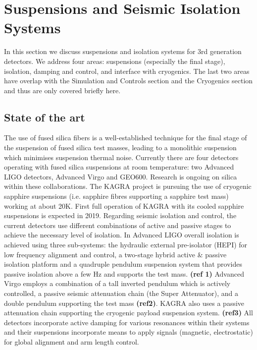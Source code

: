 \chapter{Suspensions and Seismic Isolation Systems}
\label{sec:Suspensions_Isolation}
In this section we discuss suspensions and isolation systems for 3rd generation detectors. We address four areas: suspensions (especially the final stage), isolation, damping and control, and interface with cryogenics. The last two areas have overlap with the Simulation and Controls section and the Cryogenics section and thus are only covered briefly here.
\section{State of the art}
The use of fused silica fibers is a well-established technique for the final stage of the suspension of fused silica test masses, leading to a monolithic suspension which minimises suspension thermal noise. Currently there are four detectors operating with fused silica suspensions at room temperature: two Advanced LIGO detectors, Advanced Virgo and GEO600. Research is ongoing on silica within these collaborations.
The KAGRA project is pursuing the use of cryogenic sapphire suspensions (i.e. sapphire fibres supporting a sapphire test mass) working at about 20K. First full operation of KAGRA with its cooled sapphire suspensions is expected in 2019.
Regarding seismic isolation and control, the current detectors use different combinations of active and passive stages to achieve the necessary level of isolation. In Advanced LIGO overall isolation is achieved using three sub-systems: the hydraulic external pre-isolator (HEPI) for low frequency alignment and control, a two-stage hybrid active \& passive isolation platform and a quadruple pendulum suspension system that provides passive isolation above a few Hz and supports the test mass. \textbf{(ref 1)}  Advanced Virgo employs a combination of a tall inverted pendulum which is actively controlled, a passive seismic attenuation chain (the Super Attenuator), and a double pendulum supporting the test mass \textbf{(ref2)}. KAGRA also uses a passive attenuation chain supporting the cryogenic payload suspension system. \textbf{(ref3)} All detectors incorporate active damping for various resonances within their systems and their suspensions incorporate means to apply signals (magnetic, electrostatic) for global alignment and arm length control.

